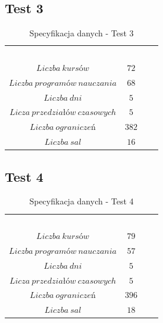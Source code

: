 \subsection{Test 3}
\begin{table}[H]
\begin{center}

\begin{tabular}{ |c|c|c|c| }
\multicolumn{1}{r}{}
 &  \multicolumn{1}{c}{$$}
 & \multicolumn{1}{c}{$$} 
 \\
\cline{1-2}
$Liczba\ kursów$ & $72$\\
\cline{1-2}
$Liczba\ programów\ nauczania$ & $68$\\
\cline{1-2}
$Liczba\ dni$ & $5$ \\
\cline{1-2}
$Licza\ przedziałów\ czasowych$ & $5$ \\
\cline{1-2}
$Liczba\ ograniczeń$ & $382$ \\
\cline{1-2}
$Liczba\ sal$ & $16$ \\
\cline{1-2}
\end{tabular}
\end{center}
\caption {Specyfikacja danych - Test 3}
\end{table}

\subsection{Test 4}
\begin{table}[H]
\begin{center}

\begin{tabular}{ |c|c|c|c| }
\multicolumn{1}{r}{}
 &  \multicolumn{1}{c}{$$}
 & \multicolumn{1}{c}{$$} 
 \\
\cline{1-2}
$Liczba\ kursów$ & $79$\\
\cline{1-2}
$Liczba\ programów\ nauczania$ & $57$\\
\cline{1-2}
$Liczba\ dni$ & $5$ \\
\cline{1-2}
$Licza\ przedziałów\ czasowych$ & $5$ \\
\cline{1-2}
$Liczba\ ograniczeń$ & $396$ \\
\cline{1-2}
$Liczba\ sal$ & $18$ \\
\cline{1-2}
\end{tabular}
\end{center}
\caption {Specyfikacja danych - Test 4}
\end{table}

